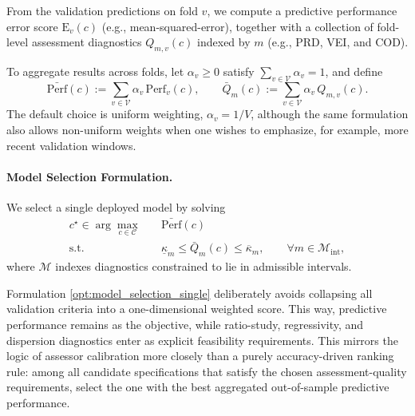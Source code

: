 \documentclass[12pt, draft]{article}
\theoremstyle{plain}
\theoremstyle{definition}
\newcommand{\1}{\mathbf{1}}
\begin{document}
{From the validation predictions on fold $v$, we compute a predictive performance error score $\mathrm{E}_v(c)$ (e.g., mean-squared-error), together with a collection of fold-level assessment diagnostics $Q_{m,v}(c)$ indexed by $m$ (e.g., PRD, VEI, and COD). 


To aggregate results across folds, let $\alpha_v\ge 0$ satisfy $\sum_{v\in\mathcal V}\alpha_v=1$, and define
\[
\bar{\mathrm{Perf}}(c):=\sum_{v\in\mathcal V}\alpha_v\,\mathrm{Perf}_v(c),
\qquad
\bar Q_m(c):=\sum_{v\in\mathcal V}\alpha_v\,Q_{m,v}(c).
\]
The default choice is uniform weighting, $\alpha_v=1/V$, although the same formulation also allows non-uniform weights when one wishes to emphasize, for example, more recent validation windows.


\paragraph{Model Selection Formulation.} 
We select a single deployed model by solving
\begin{align}
    \label{opt:model_selection_single}
    c^\star
    \in
    \arg\max_{c\in\mathcal C}
    \quad
    & \bar{\mathrm{Perf}}(c)
    \\
    \text{s.t.}\quad
    & \underline{\kappa}_m \le \bar Q_m(c) \le \overline{\kappa}_m,
    \qquad \forall m\in\mathcal M_{\mathrm{int}},
    \nonumber
\end{align}
where $\mathcal M$ indexes diagnostics constrained to lie in admissible intervals.

Formulation \eqref{opt:model_selection_single} deliberately avoids collapsing all validation criteria into a one-dimensional weighted score. This way, predictive performance remains as the objective, while ratio-study, regressivity, and dispersion diagnostics enter as explicit feasibility requirements. This mirrors the logic of assessor calibration more closely than a purely accuracy-driven ranking rule: among all candidate specifications that satisfy the chosen assessment-quality requirements, select the one with the best aggregated out-of-sample predictive performance.

}
\end{document}
